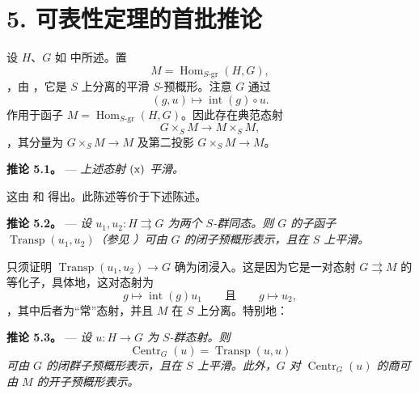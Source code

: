 
\section*{5. 可表性定理的首批推论}

设 \(H\)、\(G\) 如  中所述。置  \[
  M=\operatorname{Hom}_{S\text{-}\mathrm{gr}}(H,G),
\]，由 ，它是 \(S\) 上分离的平滑 \(S\)-预概形。注意 \(G\) 通过  \[
  (g,u)\longmapsto\operatorname{int}(g)\circ u.
\] 作用于函子 \(M=\operatorname{Hom}_{S\text{-}\mathrm{gr}}(H,G)\)。因此存在典范态射  \[
  \tag{x}
  G\times_S M\longrightarrow M\times_S M,
\]，其分量为  \(G\times_S M\to M\) 及第二投影 \(G\times_S M\to M\)。

\medskip\noindent{}\textbf{推论 5.1。} --- \textit{上述态射 \(\mathrm{\SGARefLink{sga3:xi:display:5:x}{(x)}}\) 平滑。}

这由  和  得出。此陈述等价于下述陈述。

\medskip\noindent{}\textbf{推论 5.2。} --- \textit{设 \(u_1,u_2:H\rightrightarrows G\) 为两个 \(S\)-群同态。则 \(G\) 的子函子 \(\operatorname{Transp}(u_1,u_2)\)（参见 ）可由 \(G\) 的闭子预概形表示，且在 \(S\) 上平滑。}

只须证明 \(\operatorname{Transp}(u_1,u_2)\to G\) 确为闭浸入。这是因为它是一对态射 \(G\rightrightarrows M\) 的等化子，具体地，这对态射为 \[
  g\longmapsto\operatorname{int}(g)u_1
  \qquad\text{且}\qquad
  g\longmapsto u_2,
\]，其中后者为“常”态射，并且 \(M\) 在 \(S\) 上分离。特别地：

\medskip\noindent{}\textbf{推论 5.3。} --- \textit{设 \(u:H\to G\) 为 \(S\)-群态射。则 \[
  \operatorname{Centr}_G(u)=\operatorname{Transp}(u,u)
\] 可由 \(G\) 的闭群子预概形表示，且在 \(S\) 上平滑。此外，\(G\) 对 \(\operatorname{Centr}_G(u)\) 的商可由 \(M\) 的开子预概形表示。}

